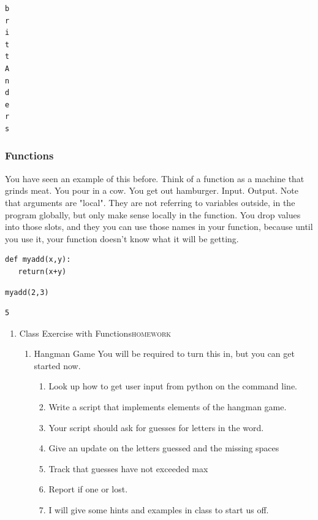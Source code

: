 \documentclass{article}
\begin{document}
\begin{enumerate}
\begin{enumerate}
\begin{verbatim}
b
r
i
t
t
A
n
d
e
r
s
\end{verbatim}
\end{enumerate}
\end{enumerate}

\subsubsection{Functions}
\label{sec:org32fb45f}
You have seen an example of this before. Think of a function as a machine that grinds meat. You pour in a cow. You get out hamburger. Input. Output. Note that arguments are "local". They are not referring to variables outside, in the program globally, but only make sense locally in the function. You drop values into those slots, and they you can use those names  in your function, because until you use it, your function doesn't know what it will be getting. 
\begin{verbatim}
def myadd(x,y):
   return(x+y)
\end{verbatim}

\begin{verbatim}
myadd(2,3)
\end{verbatim}

\begin{verbatim}
5
\end{verbatim}

\begin{enumerate}
\item Class Exercise with Functions\hfill{}\textsc{homework}
\label{sec:org5b4135d}

\begin{enumerate}
\item Hangman Game
\label{sec:orga2a232c}
You will be required to turn this in, but you can get started now. 
\begin{enumerate}
\item Look up how to get user input from python on the command line.
\item Write a script that implements elements of the hangman game.
\item Your script should ask for guesses for letters in the word.
\item Give an update on the letters guessed and the missing spaces
\item Track that guesses have not exceeded max
\item Report if one or lost.
\item I will give some hints and examples in class to start us off.
\end{enumerate}
\end{enumerate}
\end{enumerate}
\end{document}
